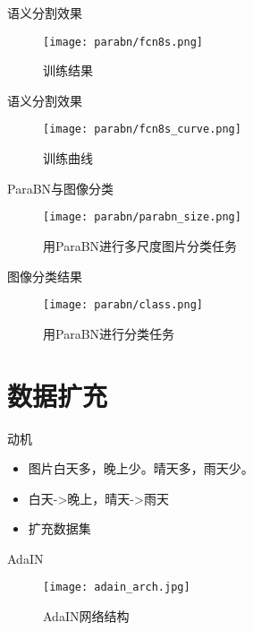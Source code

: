 \documentclass[hyperref={unicode=true}]{beamer}
\theoremstyle{definition}
\theoremstyle{proof}
\begin{document}
\begin{frame}{语义分割效果}
  \begin{figure}[!h]
    \centering
    \texttt{[image: parabn/fcn8s.png]}
    \caption{训练结果}
    \label{fig:parabn_fcn8s}
  \end{figure}
\end{frame}


\begin{frame}{语义分割效果}
  \begin{figure}[!h]
    \centering
    \texttt{[image: parabn/fcn8s\_curve.png]}
    \caption{训练曲线}
    \label{fig:parabn_fcn8s}
  \end{figure}
\end{frame}

\begin{frame}{ParaBN与图像分类}
  \begin{figure}[!h]
    \centering
    \texttt{[image: parabn/parabn\_size.png]}
    \caption{用ParaBN进行多尺度图片分类任务}
    \label{fig:parabn_size}
  \end{figure}
\end{frame}

\begin{frame}{图像分类结果}
  \begin{figure}[!h]
    \centering
    \texttt{[image: parabn/class.png]}
    \caption{用ParaBN进行分类任务}
    \label{fig:parabn_class}
  \end{figure}
\end{frame}

\section{数据扩充}

\begin{frame}{动机}
  \begin{itemize}
  \item 图片白天多，晚上少。晴天多，雨天少。
  \item 白天->晚上，晴天->雨天
  \item 扩充数据集
  \end{itemize}
\end{frame}

\begin{frame}{AdaIN}
  \begin{figure}[!h]
    \centering
    \texttt{[image: adain\_arch.jpg]}
    \caption{AdaIN网络结构}
    \label{fig:adain_arch}
  \end{figure}
\end{frame}
\end{document}
